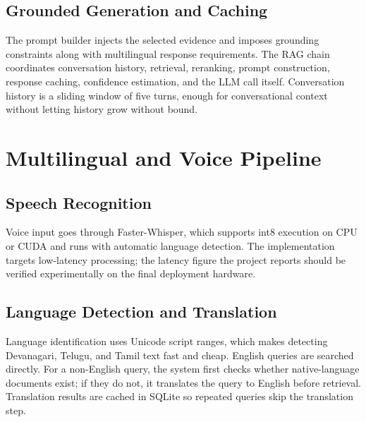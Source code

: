 \documentclass[10pt,twocolumn,letterpaper]{article}
\begin{document}
\subsection{Grounded Generation and Caching}
The prompt builder injects the selected evidence and imposes grounding constraints along with multilingual response requirements. The RAG chain coordinates conversation history, retrieval, reranking, prompt construction, response caching, confidence estimation, and the LLM call itself. Conversation history is a sliding window of five turns, enough for conversational context without letting history grow without bound.

\section{Multilingual and Voice Pipeline}
\subsection{Speech Recognition}
Voice input goes through Faster-Whisper, which supports int8 execution on CPU or CUDA and runs with automatic language detection. The implementation targets low-latency processing; the latency figure the project reports should be verified experimentally on the final deployment hardware.

\subsection{Language Detection and Translation}
Language identification uses Unicode script ranges, which makes detecting Devanagari, Telugu, and Tamil text fast and cheap. English queries are searched directly. For a non-English query, the system first checks whether native-language documents exist; if they do not, it translates the query to English before retrieval. Translation results are cached in SQLite so repeated queries skip the translation step.
\end{document}
